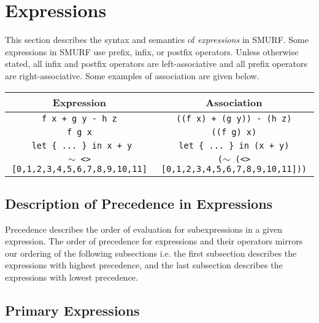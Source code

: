 \section{Expressions}

This section describes the syntax and semantics of \emph{expressions} in 
SMURF. Some expressions in SMURF use prefix, infix, or postfix operators.
Unless otherwise stated, all infix and postfix operators are left-associative and
all prefix operators are right-associative. Some examples of association are given below.


\begin{center}
	\begin{tabular}{|c|c|}
		\hline
		Expression & Association \\
		\hline
		\texttt{f x + g y - h z} & \texttt{((f x) + (g y)) - (h z)} \\
		\texttt{f g x} & \texttt{((f g) x)} \\
		\texttt{ let \{ ... \} in x + y} & \texttt{let \{ ... \} in (x + y)} \\
		\texttt{$\sim$ <> [0,1,2,3,4,5,6,7,8,9,10,11]} &
					\texttt{($\sim$ (<> [0,1,2,3,4,5,6,7,8,9,10,11]))}\\
		\hline
	\end{tabular}
\end{center}

%
%
%

\subsection{Description of Precedence in Expressions}
Precedence describes the order of evaluation for subexpressions in a given expression.
The order of precedence for expressions and their operators mirrors our ordering of the following
subsections i.e. the first subsection describes the expressions with highest precedence, and the last
subsection describes the expressions with lowest precedence.

\subsection{Primary Expressions}

